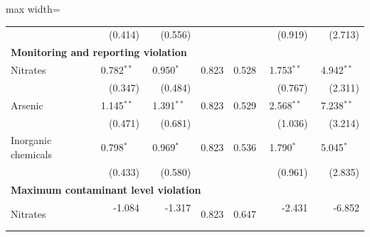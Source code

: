 \begin{table}[htbp]
{\begin{adjustbox}{max width=\linewidth}
\begin{tabular}{lrrrrrr}
 & (\phantom{-}0.414)\phantom{$^{***}$} & (\phantom{-}0.556)\phantom{$^{***}$} &  &  & (\phantom{-}\phantom{0}0.919)\phantom{$^{***}$} & (\phantom{-}\phantom{0}2.713)\phantom{$^{***}$} \\
\multicolumn{7}{l}{\textbf{Monitoring and reporting violation}} \\
Nitrates & \phantom{(}\phantom{-}0.782$^{**\phantom{*}}$ & \phantom{(}\phantom{-}0.950$^{*\phantom{*}\phantom{*}}$ & \phantom{(}\phantom{-}0.823\phantom{$^{***}$} & \phantom{(}\phantom{-}0.528\phantom{$^{***}$} & \phantom{(}\phantom{-}\phantom{0}1.753$^{**\phantom{*}}$ & \phantom{(}\phantom{-}\phantom{0}4.942$^{**\phantom{*}}$ \\
 & (\phantom{-}0.347)\phantom{$^{***}$} & (\phantom{-}0.484)\phantom{$^{***}$} &  &  & (\phantom{-}\phantom{0}0.767)\phantom{$^{***}$} & (\phantom{-}\phantom{0}2.311)\phantom{$^{***}$} \\
Arsenic & \phantom{(}\phantom{-}1.145$^{**\phantom{*}}$ & \phantom{(}\phantom{-}1.391$^{**\phantom{*}}$ & \phantom{(}\phantom{-}0.823\phantom{$^{***}$} & \phantom{(}\phantom{-}0.529\phantom{$^{***}$} & \phantom{(}\phantom{-}\phantom{0}2.568$^{**\phantom{*}}$ & \phantom{(}\phantom{-}\phantom{0}7.238$^{**\phantom{*}}$ \\
 & (\phantom{-}0.471)\phantom{$^{***}$} & (\phantom{-}0.681)\phantom{$^{***}$} &  &  & (\phantom{-}\phantom{0}1.036)\phantom{$^{***}$} & (\phantom{-}\phantom{0}3.214)\phantom{$^{***}$} \\
Inorganic chemicals & \phantom{(}\phantom{-}0.798$^{*\phantom{*}\phantom{*}}$ & \phantom{(}\phantom{-}0.969$^{*\phantom{*}\phantom{*}}$ & \phantom{(}\phantom{-}0.823\phantom{$^{***}$} & \phantom{(}\phantom{-}0.536\phantom{$^{***}$} & \phantom{(}\phantom{-}\phantom{0}1.790$^{*\phantom{*}\phantom{*}}$ & \phantom{(}\phantom{-}\phantom{0}5.045$^{*\phantom{*}\phantom{*}}$ \\
 & (\phantom{-}0.433)\phantom{$^{***}$} & (\phantom{-}0.580)\phantom{$^{***}$} &  &  & (\phantom{-}\phantom{0}0.961)\phantom{$^{***}$} & (\phantom{-}\phantom{0}2.835)\phantom{$^{***}$} \\
\multicolumn{7}{l}{\textbf{Maximum contaminant level violation}} \\
Nitrates & \phantom{(}-1.084$^{\phantom{*}\phantom{*}\phantom{*}}$ & \phantom{(}-1.317$^{\phantom{*}\phantom{*}\phantom{*}}$ & \phantom{(}\phantom{-}0.823\phantom{$^{***}$} & \phantom{(}\phantom{-}0.647\phantom{$^{***}$} & \phantom{(}-\phantom{0}2.431$^{\phantom{*}\phantom{*}\phantom{*}}$ & \phantom{(}-\phantom{0}6.852$^{\phantom{*}\phantom{*}\phantom{*}}$ \\

\end{tabular}
\end{adjustbox}}
\end{table}
